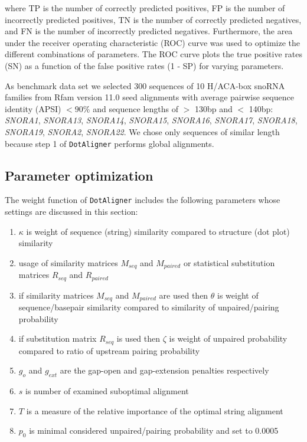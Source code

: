 \documentclass[a4paper,twoside]{article}
\newcommand\dotaligner{\texttt{DotAligner}}
\newcommand{\GRAY}[1]{\textcolor{mygray}{#1}}
\begin{document}
where TP is the number of correctly predicted positives, FP is the number of
incorrectly predicted positives, TN is the number of correctly predicted
negatives, and FN is the number of incorrectly predicted negatives.
Furthermore, the area under the receiver operating characteristic (ROC) curve
was used to optimize the different combinations of parameters. The ROC curve
plots the true positive rates (SN) as a function of the false positive rates (1
- SP) for varying parameters.

\GRAY{As benchmark data set we selected 300 sequences of 10 H/ACA-box snoRNA families
from Rfam version 11.0 seed alignments with average pairwise sequence identity
(APSI) $< 90\%$ and sequence lengths of $>$ 130bp and $<$ 140bp: \emph{SNORA1},
\emph{SNORA13}, \emph{SNORA14}, \emph{SNORA15}, \emph{SNORA16}, \emph{SNORA17},
\emph{SNORA18}, \emph{SNORA19}, \emph{SNORA2}, \emph{SNORA22}. We chose only
sequences of similar length because step 1 of \dotaligner{} performs global
alignments.}


\subsection{Parameter optimization}

\noindent  The weight function of \dotaligner{} includes the following
parameters whose settings are discussed in this section:

\begin{enumerate}
	\item $\kappa$ is weight of sequence (string) similarity compared to structure (dot plot) similarity
	\item usage of similarity matrices $M_{seq}$ and $M_{paired}$ or statistical substitution matrices $R_{seq}$ and $R_{paired}$
	\item if similarity matrices $M_{seq}$ and $M_{paired}$ are used then $\theta$ is weight of sequence/basepair similarity compared to similarity of unpaired/pairing probability
	\item if substitution matrix $R_{seq}$ is used then $\zeta$ is weight of unpaired probability compared to ratio of upstream pairing probability 
	\item $g_o$ and $g_{ext}$ are the gap-open and gap-extension penalties respectively
	\item $s$ is number of examined suboptimal alignment
	\item $T$ is a measure of the relative importance of the optimal string alignment
	\item $p_0$ is minimal considered unpaired/pairing probability and set to 0.0005
\end{enumerate}
\end{document}

